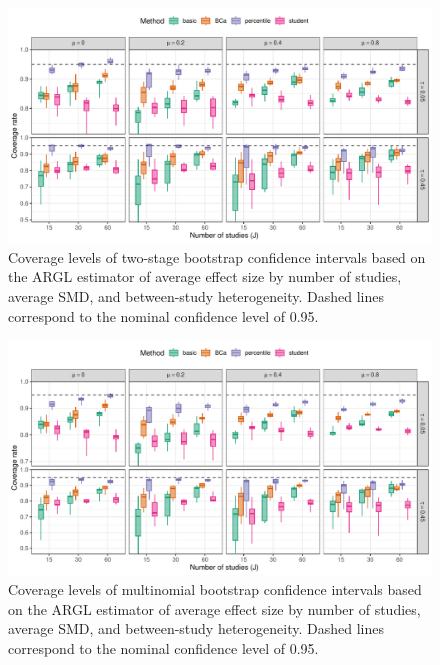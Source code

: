 \documentclass[
  american,
  man, donotrepeattitle,floatsintext]{apa7}
\begin{document}
\begin{figure}
\includegraphics{step-function-selection-models-with-dependent-effects_files/figure-latex/ARGL-coverage-two-stage-1} \caption{Coverage levels of two-stage bootstrap confidence intervals based on the ARGL estimator of average effect size by number of studies, average SMD, and between-study heterogeneity. Dashed lines correspond to the nominal confidence level of 0.95.}\label{fig:ARGL-coverage-two-stage}
\end{figure}

\begin{figure}
\includegraphics{step-function-selection-models-with-dependent-effects_files/figure-latex/ARGL-coverage-multinomial-1} \caption{Coverage levels of multinomial bootstrap confidence intervals based on the ARGL estimator of average effect size by number of studies, average SMD, and between-study heterogeneity. Dashed lines correspond to the nominal confidence level of 0.95.}\label{fig:ARGL-coverage-multinomial}
\end{figure}
\end{document}
